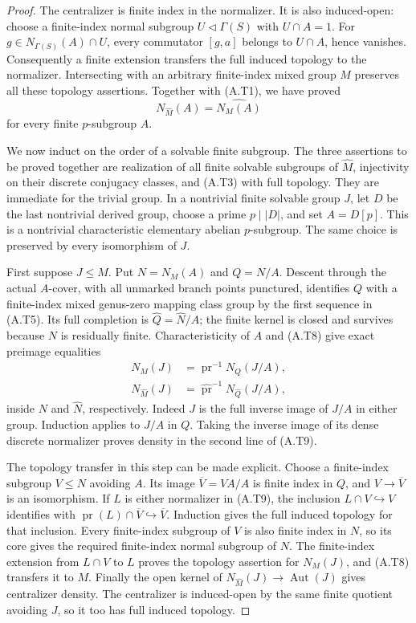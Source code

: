 \begin{proof}
The centralizer is finite index in the normalizer.  It is also
induced-open: choose a finite-index normal subgroup
$U\triangleleft\Gamma(S)$ with $U\cap A=1$.  For
$g\in N_{\Gamma(S)}(A)\cap U$, every commutator $[g,a]$
belongs to $U\cap A$, hence vanishes.  Consequently a finite
extension transfers the full induced topology to the normalizer.
Intersecting with an arbitrary finite-index mixed group $M$
preserves all these topology assertions.  Together with (A.T1),
we have proved
\[
 N_{\widehat M}(A)=\widehat{N_M(A)}
                                                        \tag{A.T8}
\]
for every finite $p$-subgroup $A$.

We now induct on the order of a solvable finite subgroup.  The
three assertions to be proved together are realization of all
finite solvable subgroups of $\widehat M$, injectivity on their
discrete conjugacy classes, and (A.T3) with full topology.  They
are immediate for the trivial group.  In a nontrivial finite
solvable group $J$, let $D$ be the last nontrivial derived group,
choose a prime $p\mid|D|$, and set $A=D[p]$.  This is a nontrivial
characteristic elementary abelian $p$-subgroup.  The same choice is
preserved by every isomorphism of $J$.

First suppose $J\leq M$.  Put $N=N_M(A)$ and $Q=N/A$.
Descent through the actual $A$-cover, with all unmarked branch
points punctured, identifies $Q$ with a finite-index mixed
genus-zero mapping class group by the first sequence in (A.T5).
Its full completion is $\widehat Q=\widehat N/A$; the finite
kernel is closed and survives because $N$ is residually finite.
Characteristicity of $A$ and (A.T8) give exact preimage equalities
\[
\begin{split}
 N_M(J)&=\operatorname{pr}^{-1}N_Q(J/A),\\
 N_{\widehat M}(J)&=\widehat{\operatorname{pr}}^{-1}
                         N_{\widehat Q}(J/A),
\end{split}                                                  \tag{A.T9}
\]
inside $N$ and $\widehat N$, respectively.  Indeed $J$ is the
full inverse image of $J/A$ in either group.  Induction applies
to $J/A$ in $Q$.  Taking the inverse image of its dense discrete
normalizer proves density in the second line of (A.T9).

The topology transfer in this step can be made explicit.  Choose
a finite-index subgroup $V\leq N$ avoiding $A$.  Its image
$\overline V=VA/A$ is finite index in $Q$, and $V\to\overline V$
is an isomorphism.  If $L$ is either normalizer in (A.T9),
the inclusion $L\cap V\hookrightarrow V$ identifies with
$\operatorname{pr}(L)\cap\overline V\hookrightarrow\overline V$.
Induction gives the full induced topology for that inclusion.
Every finite-index subgroup of $V$ is also finite index in $N$,
so its core gives the required finite-index normal subgroup of
$N$.  The finite-index extension from $L\cap V$ to $L$ proves
the topology assertion for $N_M(J)$, and (A.T8) transfers it to
$M$.  Finally the open kernel of
$N_{\widehat M}(J)\to\operatorname{Aut}(J)$ gives centralizer
density.  The centralizer is induced-open by the same finite
quotient avoiding $J$, so it too has full induced topology.


\end{proof}

